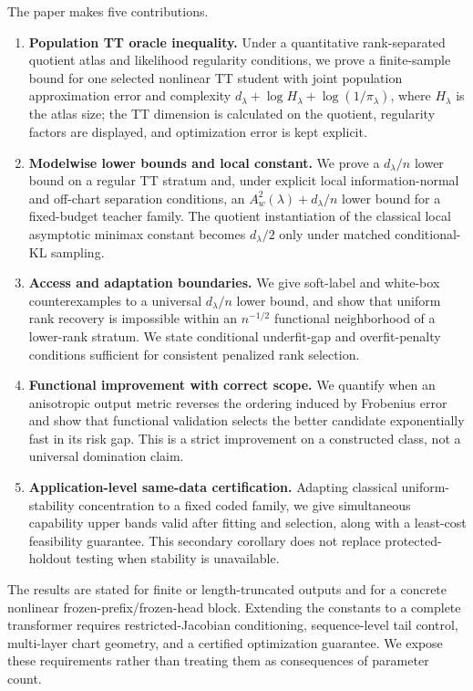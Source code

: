 The paper makes five contributions.
\begin{enumerate}[leftmargin=*,label=(C\arabic*)]
    \item \textbf{Population TT oracle inequality.} Under a quantitative rank-separated quotient atlas and likelihood regularity conditions, we prove a finite-sample bound for one selected nonlinear TT student with joint population approximation error and complexity \(d_\lambda+\log H_\lambda+\log(1/\pi_\lambda)\), where \(H_\lambda\) is the atlas size; the TT dimension is calculated on the quotient, regularity factors are displayed, and optimization error is kept explicit.
    \item \textbf{Modelwise lower bounds and local constant.} We prove a \(d_\lambda/n\) lower bound on a regular TT stratum and, under explicit local information-normal and off-chart separation conditions, an \(A_w^2(\lambda)+d_\lambda/n\) lower bound for a fixed-budget teacher family. The quotient instantiation of the classical local asymptotic minimax constant becomes \(d_\lambda/2\) only under matched conditional-KL sampling.
    \item \textbf{Access and adaptation boundaries.} We give soft-label and white-box counterexamples to a universal \(d_\lambda/n\) lower bound, and show that uniform rank recovery is impossible within an \(n^{-1/2}\) functional neighborhood of a lower-rank stratum. We state conditional underfit-gap and overfit-penalty conditions sufficient for consistent penalized rank selection.
    \item \textbf{Functional improvement with correct scope.} We quantify when an anisotropic output metric reverses the ordering induced by Frobenius error and show that functional validation selects the better candidate exponentially fast in its risk gap. This is a strict improvement on a constructed class, not a universal domination claim.
    \item \textbf{Application-level same-data certification.} Adapting classical uniform-stability concentration to a fixed coded family, we give simultaneous capability upper bands valid after fitting and selection, along with a least-cost feasibility guarantee. This secondary corollary does not replace protected-holdout testing when stability is unavailable.
\end{enumerate}

The results are stated for finite or length-truncated outputs and for a concrete nonlinear frozen-prefix/frozen-head block. Extending the constants to a complete transformer requires restricted-Jacobian conditioning, sequence-level tail control, multi-layer chart geometry, and a certified optimization guarantee. We expose these requirements rather than treating them as consequences of parameter count.
